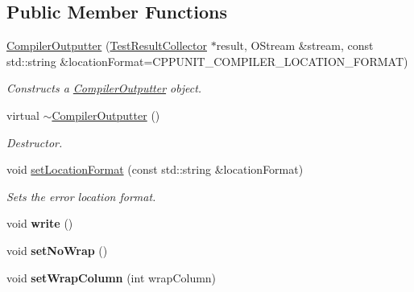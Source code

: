 \subsection*{Public Member Functions}
\begin{DoxyCompactItemize}
\item 
\hyperlink{class_compiler_outputter_a8dd6679e24c18b3ca54a4266d9d1b812}{Compiler\-Outputter} (\hyperlink{class_test_result_collector}{Test\-Result\-Collector} $\ast$result, O\-Stream \&stream, const std\-::string \&location\-Format=C\-P\-P\-U\-N\-I\-T\-\_\-\-C\-O\-M\-P\-I\-L\-E\-R\-\_\-\-L\-O\-C\-A\-T\-I\-O\-N\-\_\-\-F\-O\-R\-M\-A\-T)
\begin{DoxyCompactList}\small\item\em Constructs a \hyperlink{class_compiler_outputter}{Compiler\-Outputter} object. \end{DoxyCompactList}\item 
\hypertarget{class_compiler_outputter_ac74daaf4b355850c5e70b743aac2df82}{virtual \hyperlink{class_compiler_outputter_ac74daaf4b355850c5e70b743aac2df82}{$\sim$\-Compiler\-Outputter} ()}\label{class_compiler_outputter_ac74daaf4b355850c5e70b743aac2df82}

\begin{DoxyCompactList}\small\item\em Destructor. \end{DoxyCompactList}\item 
void \hyperlink{class_compiler_outputter_a0d9e67c7bdcb443b0b2754d61a10790c}{set\-Location\-Format} (const std\-::string \&location\-Format)
\begin{DoxyCompactList}\small\item\em Sets the error location format. \end{DoxyCompactList}\item 
\hypertarget{class_compiler_outputter_a55ca2189956b9b52bdfb1802bf8da445}{void {\bfseries write} ()}\label{class_compiler_outputter_a55ca2189956b9b52bdfb1802bf8da445}

\item 
\hypertarget{class_compiler_outputter_aaa1d8281f8973552a8e9a4568b7d90b4}{void {\bfseries set\-No\-Wrap} ()}\label{class_compiler_outputter_aaa1d8281f8973552a8e9a4568b7d90b4}

\item 
\hypertarget{class_compiler_outputter_ab3559c2aaa88cbccb7c3823b3dd4d247}{void {\bfseries set\-Wrap\-Column} (int wrap\-Column)}\label{class_compiler_outputter_ab3559c2aaa88cbccb7c3823b3dd4d247}


\end{DoxyCompactItemize}
